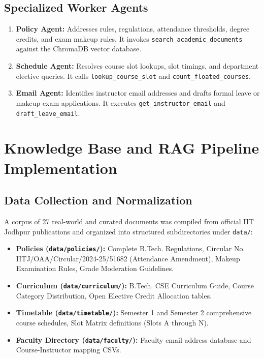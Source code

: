 \documentclass[10pt,a4paper]{article}
\begin{document}
\subsection{Specialized Worker Agents}
\begin{enumerate}
    \item \textbf{Policy Agent:} Addresses rules, regulations, attendance thresholds, degree credits, and exam makeup rules. It invokes \texttt{search\_academic\_documents} against the ChromaDB vector database.
    \item \textbf{Schedule Agent:} Resolves course slot lookups, slot timings, and department elective queries. It calls \texttt{lookup\_course\_slot} and \texttt{count\_floated\_courses}.
    \item \textbf{Email Agent:} Identifies instructor email addresses and drafts formal leave or makeup exam applications. It executes \texttt{get\_instructor\_email} and \texttt{draft\_leave\_email}.
\end{enumerate}

\section{Knowledge Base and RAG Pipeline Implementation}
\subsection{Data Collection and Normalization}
A corpus of 27 real-world and curated documents was compiled from official IIT Jodhpur publications and organized into structured subdirectories under \texttt{data/}:
\begin{itemize}[noitemsep]
    \item \textbf{Policies (\texttt{data/policies/}):} Complete B.Tech. Regulations, Circular No. IITJ/OAA/Circular/2024-25/51682 (Attendance Amendment), Makeup Examination Rules, Grade Moderation Guidelines.
    \item \textbf{Curriculum (\texttt{data/curriculum/}):} B.Tech. CSE Curriculum Guide, Course Category Distribution, Open Elective Credit Allocation tables.
    \item \textbf{Timetable (\texttt{data/timetable/}):} Semester 1 and Semester 2 comprehensive course schedules, Slot Matrix definitions (Slots A through N).
    \item \textbf{Faculty Directory (\texttt{data/faculty/}):} Faculty email address database and Course-Instructor mapping CSVs.
\end{itemize}
\end{document}
